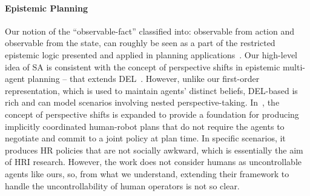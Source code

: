 \documentclass[letterpaper]{article} %
\begin{document}
\paragraph{Epistemic Planning}
Our notion of the ``observable-fact'' classified into: observable from action and observable from the state, can roughly be seen as a part of the restricted epistemic logic presented and applied in planning applications~\cite{CooperHMMPR21}. 
Our high-level idea of SA is consistent with the concept of perspective shifts in epistemic multi-agent planning -- that extends DEL~\cite{engesser2017cooperative}. 
However, unlike our first-order representation, which is used to maintain agents' distinct beliefs, DEL-based is rich and can model scenarios involving nested perspective-taking.  
In~\cite{KR2021-12}, the concept of perspective shifts is expanded to provide a foundation for producing implicitly coordinated human-robot plans that do not require the agents to negotiate and commit to a joint policy at plan time. 
In specific scenarios, it produces HR policies that are not socially awkward, which is essentially the aim of HRI research. 
However, the work does not consider humans as uncontrollable agents like ours, so, from what we understand, extending their framework to handle the uncontrollability of human operators is not so clear.  









\end{document}
